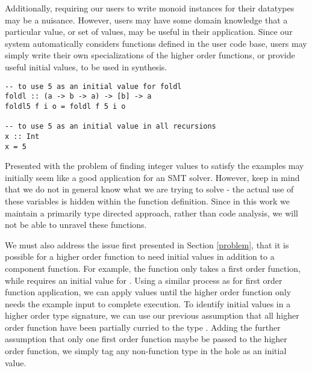 Additionally, requiring our users to write monoid instances for their datatypes may be a nuisance. However, users may have some domain knowledge that a particular value, or set of values, may be useful in their application. Since our system automatically considers functions defined in the user code base, users may simply write their own specializations of the higher order functions, or provide useful initial values, to be used in synthesis. 

\begin{lstlisting}[caption=adding default initial values]
-- to use 5 as an initial value for foldl
foldl :: (a -> b -> a) -> [b] -> a
foldl5 f i o = foldl f 5 i o

-- to use 5 as an initial value in all recursions
x :: Int
x = 5
\end{lstlisting}

Presented with the problem of finding integer values to satisfy the examples may initially seem like a good application for an SMT solver.
However, keep in mind that we do not in general know what we are trying to solve - the actual use of these variables is hidden within the function definition. Since in this work we maintain a primarily type directed approach, rather than code analysis, we will not be able to unravel these functions.

We must also address the issue first presented in Section \ref{problem}, that it is possible for a higher order function to need initial values in addition to a component function.
For example, the  function only takes a first order function, while  requires an initial value for .
Using a similar process as for first order function application, we can apply values until the higher order function only needs the example input to complete execution.
To identify initial values in a higher order type signature, we can use our previous assumption that all higher order function have been partially curried to the type \codeinline{_ -> *-> *}. 
Adding the further assumption that only one first order function maybe be passed to the higher order function, we simply tag any non-function type in the hole as an initial value.

